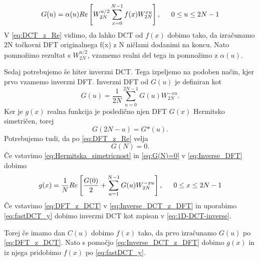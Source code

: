 \documentclass[a4paper,12pt,openright]{book}
\begin{document}
\begin{equation}
  G(u) = \alpha(u) Re \left[ W_{2N}^{u/2} \sum_{x=0}^{N-1} f(x) W_{2N}^{xu} \right], \indent 0 \leq u \leq 2N-1
\label{eq:DCT_z_Re}
\end{equation}
V \ref{eq:DCT_z_Re} vidimo, da lahko DCT od $f(x)$ dobimo tako, da izračunamo 2N točkovni DFT originalnega f(x) z N ničlami dodanimi na koncu. Nato pomnožimo rezultat s $W_{2N}^{u/2}$, vzamemo realni del tega in pomnožimo z $\alpha(u)$.\par
Sedaj potrebujemo še hiter inverzni DCT. Tega izpeljemo na podoben način, kjer prvo vzamemo inverzni DFT. Inverzni DFT od $G(u)$ je definiran kot 
\begin{equation}
  G(u) = \frac{1}{2N}\sum_{u=0}^{2N-1} G(u) W_{2N}^{-xu}.
\label{eq:Inverse_DFT}
\end{equation}
Ker je $g(x)$ realna funkcija je posledično njen DFT $G(x)$ Hermitsko simetričen, torej
\begin{equation}
  G(2N - u) = G\text{*}(u).
\label{eq:Hermitska_simetricnost}
\end{equation}
Potrebujemo tudi, da po \ref{eq:DFT_z_Re} velja
\begin{equation}
  G(N) = 0.
\label{eq:G(N)=0}
\end{equation}
Če vstavimo \ref{eq:Hermitska_simetricnost} in \ref{eq:G(N)=0} v \ref{eq:Inverse_DFT} dobimo 
\begin{equation}
  g(x) = \frac{1}{N} Re \left[ \frac{G(0)}{2} + \sum_{u=1}^{N-1} G(u) W_{2N}^{-xu}   \right], \indent 0 \leq x \leq 2N-1
\label{eq:Inverse_DCT_z_DFT}
\end{equation}
Če vstavimo \ref{eq:DFT_z_DCT} v \ref{eq:Inverse_DCT_z_DFT} in uporabimo \ref{eq:fastDCT_y} dobimo inverzni DCT kot zapisan v \ref{eq:1D-DCT-inverse}.\par
Torej če imamo dan $C(u)$ dobimo $f(x)$ tako, da prvo izračunamo $G(u)$ po \ref{eq:DFT_z_DCT}. Nato s pomočjo \ref{eq:Inverse_DCT_z_DFT} dobimo $g(x)$ in iz njega pridobimo $f(x)$ po \ref{eq:fastDCT_y}.
\end{document}
